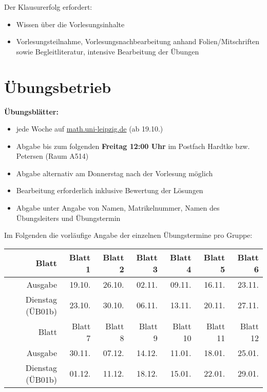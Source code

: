 \documentclass[analysis.tex]{subfiles}
\begin{document}
  Der Klausurerfolg erfordert:
  \begin{itemize}
    \item Wissen \"uber die Vorlesungsinhalte
    \item Vorlesungsteilnahme, Vorlesungsnachbearbeitung anhand Folien/Mitschriften sowie Begleitliteratur, intensive Bearbeitung der
    \"Ubungen
  \end{itemize}


  \section*{\"Ubungsbetrieb}
  \begin{description}
    \item \textbf{\"Ubungsbl\"atter:}
    \begin{itemize}
      \item jede Woche auf \url{math.uni-leipzig.de} (ab 19.10.)
      \item Abgabe bis zum folgenden \textbf{Freitag 12:00 Uhr} im Postfach Hardtke bzw. Petersen (Raum A514)
      \item Abgabe alternativ am Donnerstag nach der Vorlesung m\"oglich
      \item Bearbeitung erforderlich inklusive Bewertung der L\"osungen
      \item Abgabe unter Angabe von Namen, Matrikelnummer, Namen des \"Ubungsleiters und \"Ubungstermin
    \end{itemize}
  \end{description}

  Im Folgenden die vorl\"aufige Angabe der einzelnen \"Ubungstermine pro Gruppe:

  \begin{tabular}{r|rrrrrr}
    Blatt & Blatt 1 & Blatt 2 & Blatt 3 & Blatt 4 & Blatt 5 & Blatt 6  \\
    \hline
    Ausgabe & 19.10. & 26.10. & 02.11. & 09.11. & 16.11. & 23.11.  \\
    Dienstag (\"UB01b) & 23.10. & 30.10. & 06.11. & 13.11. & 20.11. & 27.11.  \\


    Blatt & Blatt 7 & Blatt 8 & Blatt 9 & Blatt 10 & Blatt 11 & Blatt 12  \\
    \hline
    Ausgabe & 30.11. & 07.12. & 14.12. & 11.01. & 18.01. & 25.01.  \\
    Dienstag (\"UB01b) & 01.12. & 11.12. & 18.12. & 15.01. & 22.01. & 29.01.  \\
  \end{tabular}
\end{document}
